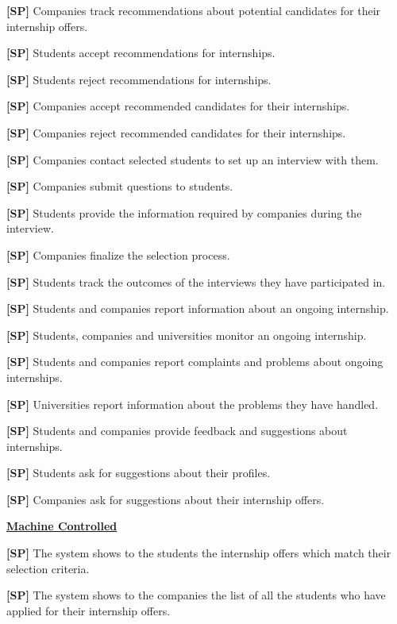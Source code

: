         \textbf{[SP\csp]} Companies track recommendations about potential candidates for their internship offers.

        \textbf{[SP\csp]} Students accept recommendations for internships.

        \textbf{[SP\csp]} Students reject recommendations for internships.
        
        \textbf{[SP\csp]} Companies accept recommended candidates for their internships. 

        \textbf{[SP\csp]} Companies reject recommended candidates for their internships. 
        
        \textbf{[SP\csp]} Companies contact selected students to set up an interview with them. 

        \textbf{[SP\csp]} Companies submit questions to students. 
        
        \textbf{[SP\csp]} Students provide the information required by companies during the interview.

        \textbf{[SP\csp]} Companies finalize the selection process.

        \textbf{[SP\csp]} Students track the outcomes of the interviews they have participated in.
        
        \textbf{[SP\csp]} Students and companies report information about an ongoing internship.

        \textbf{[SP\csp]} Students, companies and universities monitor an ongoing internship.
        
        \textbf{[SP\csp]} Students and companies report complaints and problems about ongoing internships.

        \textbf{[SP\csp]} Universities report information about the problems they have handled.

        \textbf{[SP\csp]} Students and companies provide feedback and suggestions about internships.

        \textbf{[SP\csp]} Students ask for suggestions about their profiles.

        \textbf{[SP\csp]} Companies ask for suggestions about their internship offers.

\uline{\textbf{Machine Controlled}}

        \textbf{[SP\csp]} The system shows to the students the internship offers which match their selection criteria.

        \textbf{[SP\csp]} The system shows to the companies the list of all the students who have applied for their internship offers.

